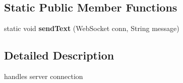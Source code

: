 \subsection*{Static Public Member Functions}
\begin{DoxyCompactItemize}
\item 
\hypertarget{classserver_1_1_h_t_t_p_connection_aa2be7a6b81a253ccf360ec91e11d2f38}{
static void {\bfseries sendText} (WebSocket conn, String message)}
\label{classserver_1_1_h_t_t_p_connection_aa2be7a6b81a253ccf360ec91e11d2f38}

\end{DoxyCompactItemize}


\subsection{Detailed Description}
handles server connection 

